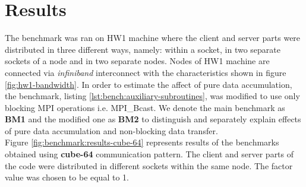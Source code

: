 \section{Results}
\label{sec:accumulator-results}


The benchmark was ran on HW1 machine where the client and server parts were distributed in three different ways, namely: within a socket, in two separate sockets of a node and in two separate nodes. Nodes of HW1 machine are connected via \textit{infiniband} interconnect with the characteristics shown in figure \ref{fig:hw1-bandwidth}. In order to estimate the affect of pure data accumulation, the benchmark, listing \ref{lst:bench:auxiliary-subroutines}, was modified to use only blocking MPI operations i.e. MPI\_Bcast. We denote the main benchmark as \textbf{BM1} and the modified one as \textbf{BM2} to distinguish and separately explain effects of pure data accumulation and non-blocking data transfer.\\


Figure \ref{fig:benchmark:results-cube-64} represents results of the benchmarks obtained using \textbf{cube-64} communication pattern. The client and server parts of the code were distributed in different sockets within the same node. The factor value was chosen to be equal to 1.\\


